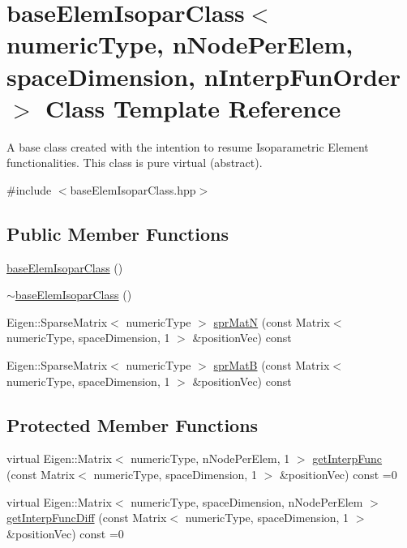 \hypertarget{classbase_elem_isopar_class}{}\section{base\+Elem\+Isopar\+Class$<$ numeric\+Type, n\+Node\+Per\+Elem, space\+Dimension, n\+Interp\+Fun\+Order $>$ Class Template Reference}
\label{classbase_elem_isopar_class}


A base class created with the intention to resume Isoparametric Element functionalities. This class is pure virtual (abstract).  




{\ttfamily \#include $<$base\+Elem\+Isopar\+Class.\+hpp$>$}

\subsection*{Public Member Functions}
\begin{DoxyCompactItemize}
\item 
\mbox{\hyperlink{classbase_elem_isopar_class_a398bc04e9d2f5468b2635fcf616651bc}{base\+Elem\+Isopar\+Class}} ()
\item 
\mbox{\hyperlink{classbase_elem_isopar_class_a4af2c68ee324c3f47bf75dfdb395eaee}{$\sim$base\+Elem\+Isopar\+Class}} ()
\item 
Eigen\+::\+Sparse\+Matrix$<$ numeric\+Type $>$ \mbox{\hyperlink{classbase_elem_isopar_class_ae8e9eb53ac374d61e86e0f24300c586c}{spr\+MatN}} (const Matrix$<$ numeric\+Type, space\+Dimension, 1 $>$ \&position\+Vec) const
\item 
Eigen\+::\+Sparse\+Matrix$<$ numeric\+Type $>$ \mbox{\hyperlink{classbase_elem_isopar_class_a483a72ba8c1ec6c79d1b7cd6a8f8d895}{spr\+MatB}} (const Matrix$<$ numeric\+Type, space\+Dimension, 1 $>$ \&position\+Vec) const
\end{DoxyCompactItemize}
\subsection*{Protected Member Functions}
\begin{DoxyCompactItemize}
\item 
virtual Eigen\+::\+Matrix$<$ numeric\+Type, n\+Node\+Per\+Elem, 1 $>$ \mbox{\hyperlink{classbase_elem_isopar_class_a9ee4f097e6c0a1affe6d9a6f6dc233ab}{get\+Interp\+Func}} (const Matrix$<$ numeric\+Type, space\+Dimension, 1 $>$ \&position\+Vec) const =0
\item 
virtual Eigen\+::\+Matrix$<$ numeric\+Type, space\+Dimension, n\+Node\+Per\+Elem $>$ \mbox{\hyperlink{classbase_elem_isopar_class_ad157a292e3faeb3e95665cf29195e0f0}{get\+Interp\+Func\+Diff}} (const Matrix$<$ numeric\+Type, space\+Dimension, 1 $>$ \&position\+Vec) const =0
\end{DoxyCompactItemize}

